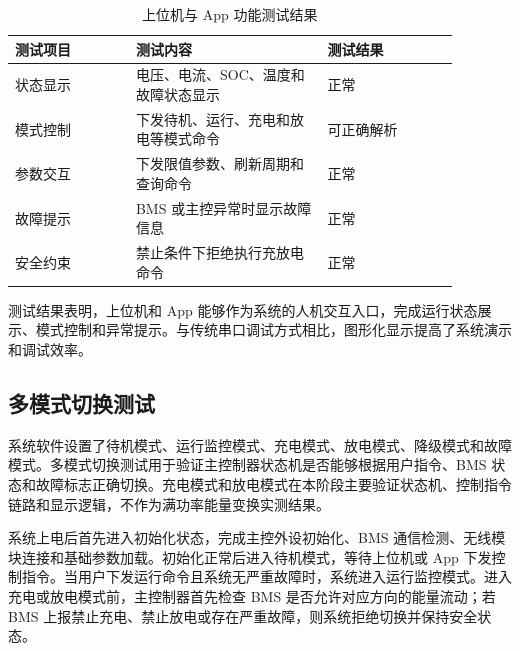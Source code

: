 \begin{table}[htbp]
  \centering
  \caption{上位机与 App 功能测试结果}
  \label{tab:app_pc_test}
  \renewcommand{\arraystretch}{1.2}
  \begin{tabular}{|m{0.24\linewidth}|m{0.38\linewidth}|m{0.26\linewidth}|}
    \hline
    \rule{0pt}{1.0cm}测试项目 & 测试内容 & 测试结果 \\
    \hline
    \rule{0pt}{1.0cm}状态显示 & 电压、电流、SOC、温度和故障状态显示 & 正常 \\
    \hline
    \rule{0pt}{1.0cm}模式控制 & 下发待机、运行、充电和放电等模式命令 & 可正确解析 \\
    \hline
    \rule{0pt}{1.0cm}参数交互 & 下发限值参数、刷新周期和查询命令 & 正常 \\
    \hline
    \rule{0pt}{1.0cm}故障提示 & BMS 或主控异常时显示故障信息 & 正常 \\
    \hline
    \rule{0pt}{1.0cm}安全约束 & 禁止条件下拒绝执行充放电命令 & 正常 \\
    \hline
  \end{tabular}
\end{table}

测试结果表明，上位机和 App 能够作为系统的人机交互入口，完成运行状态展示、模式控制和异常提示。与传统串口调试方式相比，图形化显示提高了系统演示和调试效率。

\subsection{多模式切换测试}

系统软件设置了待机模式、运行监控模式、充电模式、放电模式、降级模式和故障模式。多模式切换测试用于验证主控制器状态机是否能够根据用户指令、BMS 状态和故障标志正确切换。充电模式和放电模式在本阶段主要验证状态机、控制指令链路和显示逻辑，不作为满功率能量变换实测结果。

系统上电后首先进入初始化状态，完成主控外设初始化、BMS 通信检测、无线模块连接和基础参数加载。初始化正常后进入待机模式，等待上位机或 App 下发控制指令。当用户下发运行命令且系统无严重故障时，系统进入运行监控模式。进入充电或放电模式前，主控制器首先检查 BMS 是否允许对应方向的能量流动；若 BMS 上报禁止充电、禁止放电或存在严重故障，则系统拒绝切换并保持安全状态。

